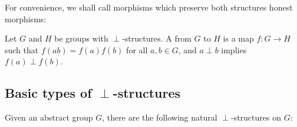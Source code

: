 \documentclass[a4paper]{amsart}
\begin{document}
For convenience, we shall call morphisms which preserve both
structures honest morphisms:

\begin{definer}
  Let $G$ and $H$ be groups with $\perp$-structures. A
   from $G$ to $H$ is a map $f:G \to H$
  such that $f(ab) = f(a)f(b)$ for all $a,b \in G$, and $a \perp b$
  implies $f(a) \perp f(b)$.
\end{definer}

\subsection{Basic types of $\perp$-structures}

Given an abstract group $G$, there are the following natural
$\perp$-structures on $G$:
\end{document}
